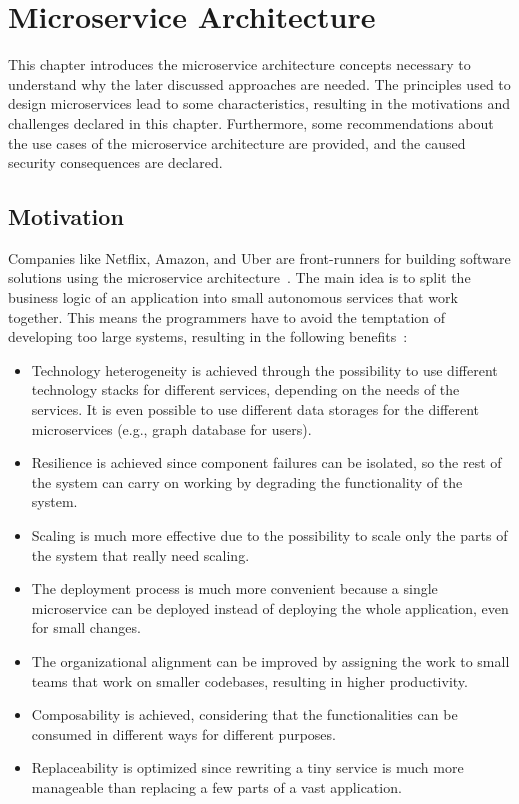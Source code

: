 \chapter{Microservice Architecture}
\label{cha:Microservice_Architecture}
This chapter introduces the microservice architecture concepts necessary to understand why the later discussed approaches are needed.
The principles used to design microservices lead to some characteristics, resulting in the motivations and challenges declared in this chapter.
Furthermore, some recommendations about the use cases of the microservice architecture are provided, and the caused security consequences are declared.

\section{Motivation}
Companies like Netflix, Amazon, and Uber are front-runners for building software solutions using the microservice architecture~\cite{dias2020microservices}.
The main idea is to split the business logic of an application into small autonomous services that work together.
This means the programmers have to avoid the temptation of developing too large systems, resulting in the following benefits~\cite{newman2021building}:
\begin{itemize}
    \item Technology heterogeneity is achieved through the possibility to use different technology stacks for different services, depending on the needs of the services.
		It is even possible to use different data storages for the different microservices (e.g., graph database for users).
    \item Resilience is achieved since component failures can be isolated, so the rest of the system can carry on working by degrading the functionality of the system. 
    \item Scaling is much more effective due to the possibility to scale only the parts of the system that really need scaling.
    \item The deployment process is much more convenient because a single microservice can be deployed instead of deploying the whole application, even for small changes.
    \item The organizational alignment can be improved by assigning the work to small teams that work on smaller codebases, resulting in higher productivity.
    \item Composability is achieved, considering that the functionalities can be consumed in different ways for different purposes.
    \item Replaceability is optimized since rewriting a tiny service is much more manageable than replacing a few parts of a vast application.
\end{itemize}

